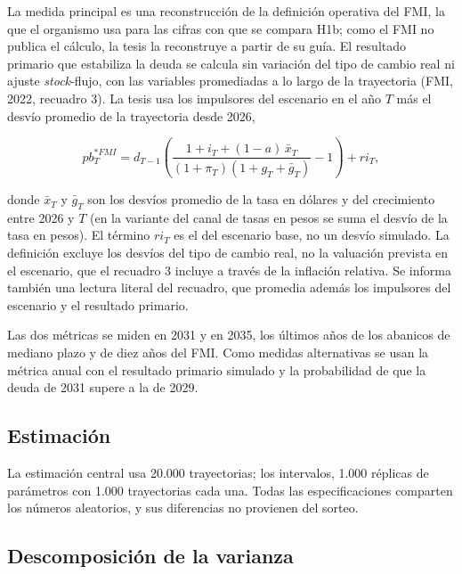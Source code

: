 La medida principal es una reconstrucción de la definición operativa del
FMI, la que el organismo usa para las cifras con que se compara H1b;
como el FMI no publica el cálculo, la tesis la reconstruye a partir de
su guía. El resultado primario que estabiliza la deuda se calcula sin
variación del tipo de cambio real ni ajuste \emph{stock}-flujo, con las
variables promediadas a lo largo de la trayectoria (FMI, 2022, recuadro
3). La tesis usa los impulsores del escenario en el año \(T\) más el
desvío promedio de la trayectoria desde 2026,

\[pb^{*FMI}_T = d_{T-1}\left(\frac{1 + i_T + (1-a)\,\bar{x}_T}{(1+\pi_T)(1+g_T+\bar{g}_T)} - 1\right) + ri_T,\]

donde \(\bar{x}_T\) y \(\bar{g}_T\) son los desvíos promedio de la tasa
en dólares y del crecimiento entre 2026 y \(T\) (en la variante del
canal de tasas en pesos se suma el desvío de la tasa en pesos). El
término \(ri_T\) es el del escenario base, no un desvío simulado. La
definición excluye los desvíos del tipo de cambio real, no la valuación
prevista en el escenario, que el recuadro 3 incluye a través de la
inflación relativa. Se informa también una lectura literal del recuadro,
que promedia además los impulsores del escenario y el resultado
primario.

Las dos métricas se miden en 2031 y en 2035, los últimos años de los
abanicos de mediano plazo y de diez años del FMI. Como medidas
alternativas se usan la métrica anual con el resultado primario simulado
y la probabilidad de que la deuda de 2031 supere a la de 2029.

\subsection{Estimación}

La estimación central usa 20.000 trayectorias; los intervalos, 1.000
réplicas de parámetros con 1.000 trayectorias cada una. Todas las
especificaciones comparten los números aleatorios, y sus diferencias no
provienen del sorteo.

\subsection{Descomposición de la varianza}

